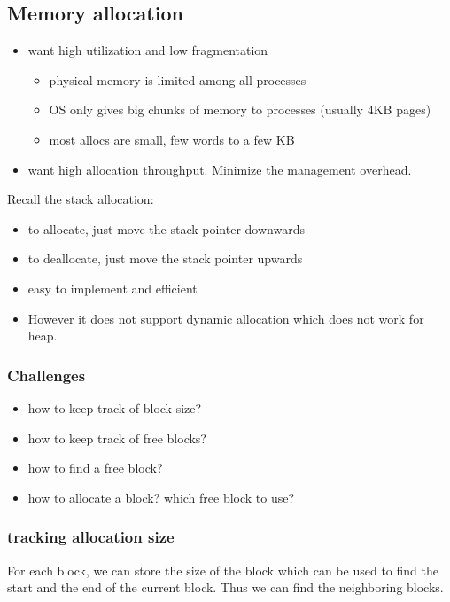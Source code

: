 \documentclass[letterpaper,12pt]{article}
\begin{document}
\subsection{Memory allocation}
\begin{itemize}
    \item want high utilization and low fragmentation\begin{itemize}
              \item physical memory is limited among all processes
              \item OS only gives big chunks of memory to processes (usually 4KB pages)
              \item most allocs are small, few words to a few KB
          \end{itemize}
    \item want high allocation throughput. Minimize the management overhead.
\end{itemize}

Recall the stack allocation:\begin{itemize}
    \item to allocate, just move the stack pointer downwards
    \item to deallocate, just move the stack pointer upwards
    \item easy to implement and efficient
    \item However it does not support dynamic allocation which does not work for heap.
\end{itemize}
\subsubsection{Challenges}
\begin{itemize}
    \item how to keep track of block size?
    \item how to keep track of free blocks?
    \item how to find a free block?
    \item how to allocate a block? which free block to use?
\end{itemize}
\subsubsection{tracking allocation size}
For each block, we can store the size of the block which can be used to find
the start and the end of the current block. Thus we can find the neighboring
blocks.
\end{document}
